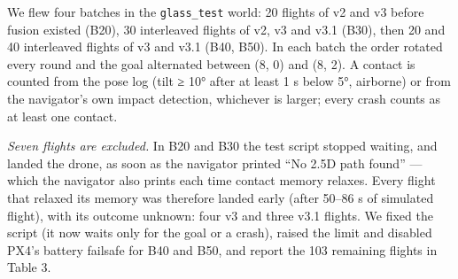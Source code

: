\documentclass[
]{article}
\begin{document}
We flew four batches in the \texttt{glass\_test} world: 20 flights of v2
and v3 before fusion existed (B20), 30 interleaved flights of v2, v3 and
v3.1 (B30), then 20 and 40 interleaved flights of v3 and v3.1 (B40,
B50). In each batch the order rotated every round and the goal
alternated between (8, 0) and (8, 2). A contact is counted from the pose
log (tilt ≥ 10° after at least 1 s below 5°, airborne) or from the
navigator's own impact detection, whichever is larger; every crash
counts as at least one contact.

\emph{Seven flights are excluded.} In B20 and B30 the test script
stopped waiting, and landed the drone, as soon as the navigator printed
``No 2.5D path found'' --- which the navigator also prints each time
contact memory relaxes. Every flight that relaxed its memory was
therefore landed early (after 50--86 s of simulated flight), with its
outcome unknown: four v3 and three v3.1 flights. We fixed the script (it
now waits only for the goal or a crash), raised the limit and disabled
PX4's battery failsafe for B40 and B50, and report the 103 remaining
flights in Table 3.
\end{document}
